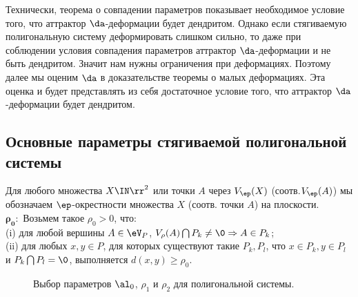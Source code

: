 Технически, теорема о совпадении параметров показывает необходимое условие того, что аттрактор $\da$-деформации будет дендритом. Однако если стягиваемую полигональную систему деформировать слишком сильно, то даже при соблюдении условия совпадения параметров аттрактор $\da$-деформации и не быть дендритом. Значит нам нужны ограничения при деформациях. Поэтому далее мы оценим $\da$ в доказательстве теоремы о малых деформациях. Эта оценка и будет представлять из себя достаточное условие того, что аттрактор $\da$-деформации будет дендритом.



\subsection{Основные параметры стягиваемой полигональной системы}

Для любого множества $X\IN\rr^2$ или точки $A$ через $V_\ep(X)$ (соотв.$V_\ep(A)$) мы обозначаем $\ep$-окрестности множества $X$ (соотв. точки $A$) на плоскости.\\

$\bm{\rho_0:}$  Возьмем такое $\rho_0>0$, что:\\ 
(i) для любой вершины $A\in \eV_P$,   $V_\rho(A) \bigcap P_k \ne \0 \Rightarrow A\in P_k$;\\ 
(ii) для любых $x, y \in P$, для которых существуют такие $P_k, P_l$, что $x \in P_k, y \in P_l$ и $P_k \bigcap P_l = \0$, выполняется $d (x, y) \ge \rho_0$. \\ 

\begin{figure}[h!]
\centering
{}
\caption{Выбор параметров $\al_0$, $\rho_1$ и $\rho_2$ для полигональной системы.}%
\label{param}%
\end{figure}


